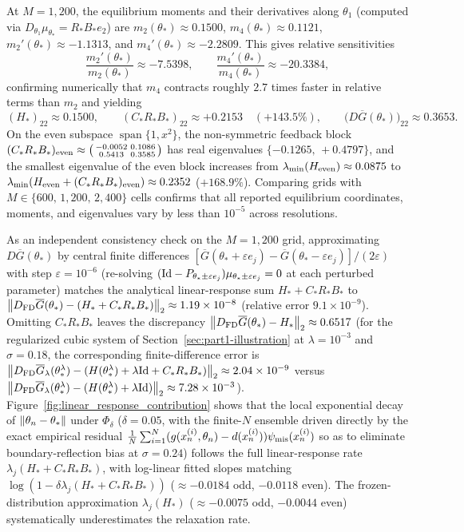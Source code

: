 At $M=1{,}200$, the equilibrium moments and their derivatives along $\theta_1$ (computed via $D_{\theta_1}\mu_{\theta_*} = R_* B_* e_2$) are $m_2(\theta_*) \approx 0.1500$, $m_4(\theta_*) \approx 0.1121$, $m_2'(\theta_*) \approx -1.1313$, and $m_4'(\theta_*) \approx -2.2809$. This gives relative sensitivities
\[
    \frac{m_2'(\theta_*)}{m_2(\theta_*)} \approx -7.5398,
    \qquad
    \frac{m_4'(\theta_*)}{m_4(\theta_*)} \approx -20.3384,
\]
confirming numerically that $m_4$ contracts roughly $2.7$ times faster in relative terms than $m_2$ and yielding
\[
    (H_*)_{22} \approx 0.1500, \qquad (C_*R_*B_*)_{22} \approx +0.2153 \quad (+143.5\%), \qquad \bigl(D\overline G(\theta_*)\bigr)_{22} \approx 0.3653.
\]
On the even subspace $\operatorname{span}\{1,x^2\}$, the non-symmetric feedback block $(C_*R_*B_*)_{\rm even} \approx \bigl(\begin{smallmatrix} -0.0052 & 0.1086 \\ 0.5413 & 0.3585 \end{smallmatrix}\bigr)$ has real eigenvalues $\{-0.1265,\, +0.4797\}$, and the smallest eigenvalue of the even block increases from $\lambda_{\min}(H_{\rm even}) \approx 0.0875$ to $\lambda_{\min}(H_{\rm even} + (C_*R_*B_*)_{\rm even}) \approx 0.2352$ ($+168.9\%$). Comparing grids with $M \in \{600,\, 1{,}200,\, 2{,}400\}$ cells confirms that all reported equilibrium coordinates, moments, and eigenvalues vary by less than $10^{-5}$ across resolutions. 

As an independent consistency check on the $M=1{,}200$ grid, approximating $D\overline G(\theta_*)$ by central finite differences $[\overline G(\theta_*+\varepsilon e_j)-\overline G(\theta_*-\varepsilon e_j)]/(2\varepsilon)$ with step $\varepsilon=10^{-6}$ (re-solving $(\mathrm{Id} - P_{\theta_*\pm\varepsilon e_j})\mu_{\theta_*\pm\varepsilon e_j}=0$ at each perturbed parameter) matches the analytical linear-response sum $H_* + C_*R_*B_*$ to $\left\lVert D_{\rm FD}\overline G(\theta_*) - (H_*+C_*R_*B_*)\right\rVert_2 \approx 1.19\times 10^{-8}$ (relative error $9.1\times 10^{-9}$). Omitting $C_*R_*B_*$ leaves the discrepancy $\left\lVert D_{\rm FD}\overline G(\theta_*) - H_*\right\rVert_2 \approx 0.6517$ (for the regularized cubic system of Section~\ref{sec:part1-illustration} at $\lambda=10^{-3}$ and $\sigma=0.18$, the corresponding finite-difference error is $\left\lVert D_{\rm FD}\overline G_\lambda(\theta_*^\lambda) - (H(\theta_*^\lambda)+\lambda\mathrm{Id}+C_*R_*B_*)\right\rVert_2 \approx 2.04\times 10^{-9}$ versus $\left\lVert D_{\rm FD}\overline G_\lambda(\theta_*^\lambda)-(H(\theta_*^\lambda)+\lambda\mathrm{Id})\right\rVert_2 \approx 7.28\times 10^{-3}$). Figure~\ref{fig:linear_response_contribution} shows that the local exponential decay of $\left\lVert \theta_n - \theta_*\right\rVert$ under $\Phi_\delta$ ($\delta=0.05$, with the finite-$N$ ensemble driven directly by the exact empirical residual $\frac{1}{N}\sum_{i=1}^N (g(x_n^{(i)},\theta_n)-d(x_n^{(i)}))\psi_{\rm mis}(x_n^{(i)})$ so as to eliminate boundary-reflection bias at $\sigma=0.24$) follows the full linear-response rate $\lambda_j(H_* + C_*R_*B_*)$, with log-linear fitted slopes matching $\log(1-\delta\lambda_j(H_*+C_*R_*B_*))$ ($\approx -0.0184$ odd, $-0.0118$ even). The frozen-distribution approximation $\lambda_j(H_*)$ ($\approx -0.0075$ odd, $-0.0044$ even) systematically underestimates the relaxation rate.


